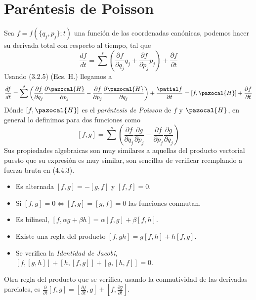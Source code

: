 \section{Paréntesis de Poisson} 
Sea $f=f(\{q_j,p_j\};t)$ una función de las coordenadas canónicas, podemos hacer su derivada total con respecto al tiempo, tal que
\begin{equation} \label{4.4.1}
    \frac{d f}{dt} = \sum^s \left(\frac{\partial f}{\partial q_j}\dot{q}_j+\frac{\partial f}{\partial p_j}\dot{p}_j\right) + \frac{\partial f}{\partial t}
\end{equation} 
Usando (3.2.5) (Ecs. H.) llegamos a 
\begin{equation} \label{4.4.2}
\frac{d f}{dt} = \sum^s \left(\frac{\partial f}{\partial q_j}\frac{\partial \pazocal{H}}{\partial p_j}-\frac{\partial f}{\partial p_j}\frac{\partial \pazocal{H}}{\partial q_j}\right) + \frac{\patial f}{\partial t} = [f,\pazocal{H}] + \frac{\partial f}{\partial t}
\end{equation} 
Dónde $[f,\pazocal{H}]$ es el \textit{paréntesis de Poisson} de $f$ y $\pazocal{H}$, en general lo definimos para dos funciones como
\begin{equation} \label{4.4.3}
    [f,g]=  \sum^s \left(\frac{\partial f}{\partial q_j}\frac{\partial g}{\partial p_j}-\frac{\partial f}{\partial p_j}\frac{\partial g}{\partial q_j}\right)
\end{equation} 
Sus propiedades algebraicas son muy similares a aquellas del producto vectorial puesto que su expresión es muy similar, son sencillas de verificar reemplando a fuerza bruta en (4.4.3).
\begin{itemize}
    \item Es alternada $[f,g]=-[g,f]$ y $[f,f]=0$.
    \item Si $[f,g]=0 \iff [f,g]=[g,f]=0$ las funciones conmutan.
    \item Es bilineal, $[f,\alpha g + \beta h] = \alpha [f,g] + \beta [f,h]$.
    \item Existe una regla del producto $[f,gh]=g[f,h]+h[f,g]$.
    \item Se verifica la \textit{Identidad de Jacobi}, $\left[f,[g,h]\right]+\left[h,[f,g]\right]+\left[g,[h,f]\right]=0$.
\end{itemize}
Otra regla del producto que se verifica, usando la conmutividad de las derivadas parciales, es $\frac{\partial}{\partial t}[f,g]=[\frac{\partial f}{\partial t},g]+[f,\frac{\partial g}{\partial t}]$.

